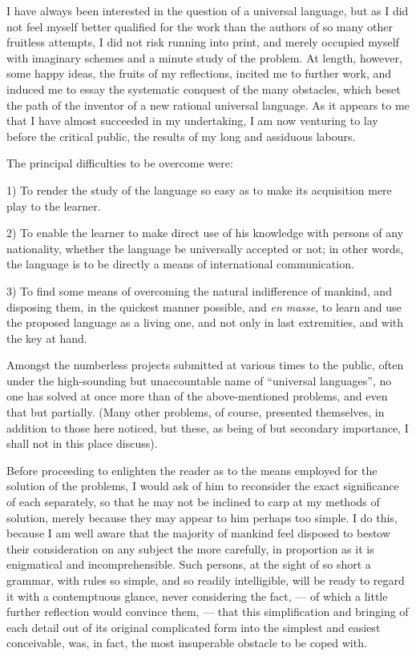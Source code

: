 \documentclass[12pt,twoside]{book}
\begin{document}
I have always been interested in the question of a universal language, but as I did not feel myself better qualified for the work than the authors of so many other fruitless attempts, I did not risk running into print, and merely occupied myself with imaginary schemes and a minute study of the problem. At length, however, some happy ideas, the fruits of my reflections, incited me to further work, and induced me to essay the systematic conquest of the many obstacles, which beset the path of the inventor of a new rational universal language. As it appears to me that I have almost succeeded in my undertaking, I am now venturing to lay before the critical public, the results of my long and assiduous labours.

The principal difficulties to be overcome were:

1) To render the study of the language so easy as to make its acquisition mere play to the learner.

2) To enable the learner to make direct use of his knowledge with persons of any nationality, whether the language be universally accepted or not; in other words, the language is to be directly a means of international communication.

3) To find some means of overcoming the natural indifference of mankind, and disposing them, in the quickest manner possible, and \emph{en masse}, to learn and use the proposed language as a living one, and not only in last extremities, and with the key at hand.

Amongst the numberless projects submitted at various times to the public, often under the high-sounding but unaccountable name of “universal languages”, no one has solved at once more than  of the above-mentioned problems, and even that but partially. (Many other problems, of course, presented themselves, in addition to those here noticed, but these, as being of but secondary importance, I shall not in this place discuss).

Before proceeding to enlighten the reader as to the means employed for the solution of the problems, I would ask of him to reconsider the exact significance of each separately, so that he may not be inclined to carp at my methods of solution, merely because they may appear to him perhaps too simple. I do this, because I am well aware that the majority of mankind feel disposed to bestow their consideration on any subject the more carefully, in proportion as it is enigmatical and incomprehensible. Such persons, at the sight of so short a grammar, with rules so simple, and so readily intelligible, will be ready to regard it with a contemptuous glance, never considering the fact, --- of which a little further reflection would convince them, --- that this simplification and bringing of each detail out of its original complicated form into the simplest and easiest conceivable, was, in fact, the most insuperable obstacle to be coped with. 
\end{document}
